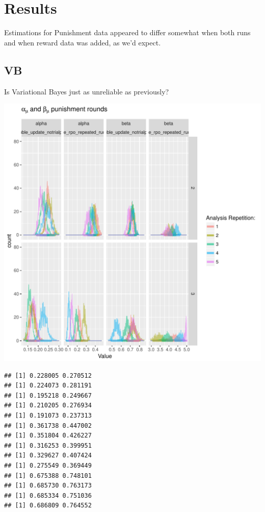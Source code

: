 \documentclass{article}\usepackage[]{graphicx}\usepackage[]{color}
\makeatletter
\def\maxwidth{ %
  \ifdim\Gin@nat@width>\linewidth
    \linewidth
  \else
    \Gin@nat@width
  \fi
}
\newenvironment{kframe}{%
 \def\at@end@of@kframe{}%
 \ifinner\ifhmode%
  \def\at@end@of@kframe{\end{minipage}}%
  \begin{minipage}{\columnwidth}%
 \fi\fi%
 \def\FrameCommand##1{\hskip\@totalleftmargin \hskip-\fboxsep
 \colorbox{shadecolor}{##1}\hskip-\fboxsep
     \hskip-\linewidth \hskip-\@totalleftmargin \hskip\columnwidth}%
 \MakeFramed {\advance\hsize-\width
   \@totalleftmargin\z@ \linewidth\hsize
   \@setminipage}}%
 {\par\unskip\endMakeFramed%
 \at@end@of@kframe}
\newenvironment{knitrout}{}{} %
\makeatother
\begin{document}
\section*{Results}





Estimations for Punishment data appeared to differ somewhat when both runs and when reward data was added, as we'd expect.


\subsection*{VB}
Is Variational Bayes just as unreliable as previously?

\begin{knitrout}
\color{fgcolor}
\includegraphics[width=\maxwidth]{figure/unnamed-chunk-6-1} 
\begin{kframe}\begin{verbatim}
## [1] 0.228005 0.270512
## [1] 0.224073 0.281191
## [1] 0.195218 0.249667
## [1] 0.210205 0.276934
## [1] 0.191073 0.237313
## [1] 0.361738 0.447002
## [1] 0.351804 0.426227
## [1] 0.316253 0.399951
## [1] 0.329627 0.407424
## [1] 0.275549 0.369449
## [1] 0.675388 0.748101
## [1] 0.685730 0.763173
## [1] 0.685334 0.751036
## [1] 0.686809 0.764552

\end{verbatim}
\end{kframe}
\end{knitrout}
\end{document}
